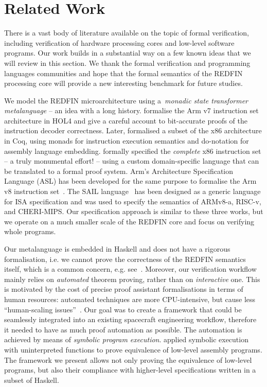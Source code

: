 \section{Related Work\label{sec-related}}
There is a vast body of literature available on the topic of formal verification,
including verification of hardware processing cores and low-level software programs.
Our work builds in a substantial way on a few known ideas that we will review in
this section. We thank the formal verification and programming languages
communities and hope that the formal semantics of the REDFIN processing core
will provide a new interesting benchmark for future studies.

We model the REDFIN microarchitecture using a~\emph{monadic state transformer
metalanguage} -- an idea with a long history.
\citet{fox2010trustworthy} formalise the Arm v7 instruction
set architecture in HOL4 and give a careful account to bit-accurate proofs of
the instruction decoder correctness. Later, \citet{kennedy2013coq}
formalised a subset of the x86 architecture in Coq, using monads for instruction
execution semantics and \textsf{do}-notation for assembly language embedding.
\citet{degenbaev2012formal} formally specified the \emph{complete} x86
instruction set -- a truly monumental effort! -- using a custom domain-specific
language that can be translated to a formal proof system. Arm's Architecture
Specification Language (ASL) has been developed for the same purpose to formalise the
Arm v8 instruction set~\cite{reid2016cav}. The SAIL language~\cite{SAIL-lang} has
been designed as a generic language for ISA specification and was used to
specify the semantics of ARMv8-a, RISC-v, and CHERI-MIPS.
Our specification approach is similar to these three works, but we operate on a
much smaller scale of the REDFIN core and focus on verifying whole programs.

Our metalanguage is embedded in Haskell and does not have a rigorous
formalisation, i.e. we cannot prove the correctness of the REDFIN semantics
itself, which is a common concern, e.g. see~\citet{reid2017oopsla}. Moreover, our
verification workflow mainly relies on \emph{automated} theorem proving, rather
than on \emph{interactive} one. This is motivated by the cost of precise proof
assistant formalisations in terms of human resources: automated techniques are
more CPU-intensive, but cause less ``human-scaling issues''~\cite{reid2016cav}.
Our goal was to create a framework that could be seamlessly
integrated into an existing spacecraft engineering workflow, therefore it needed
to have as much proof automation as possible. The automation is achieved by means
of \emph{symbolic program execution}. \citet{Currie2006} applied
symbolic execution with uninterpreted functions to prove equivalence of low-level
assembly programs. The framework we present allows not only proving the
equivalence of low-level programs, but also their compliance with higher-level
specifications written in a subset of Haskell.

